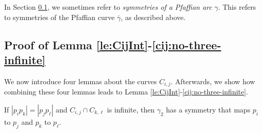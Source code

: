 \documentclass[11pt]{article}
\theoremstyle{definition}
\begin{document}
In Section \ref{sec:Lemmab}, we sometimes refer to \emph{symmetries of a Pfaffian arc} $\gamma$. 
This refers to symmetries of the Pfaffian curve $\overline{\gamma}$, as described above.

\subsection{Proof of Lemma \ref{le:CijInt}-\ref{cij:no-three-infinite}} \label{sec:Lemmab}

We now introduce four lemmas about the curves $C_{i,j}$.
Afterwards, we show how combining these four lemmas leads to Lemma \ref{le:CijInt}-\ref{cij:no-three-infinite}.

\begin{lemma}\label{le:samedist}
 If $|p_i p_k| = |p_j p_\ell|$ and $C_{i,j}\cap C_{k,\ell}$ is infinite,  then $\gamma_2$ has a symmetry that maps $p_i$ to $p_j$ and $p_k$ to $p_\ell$.
\end{lemma}
\end{document}
